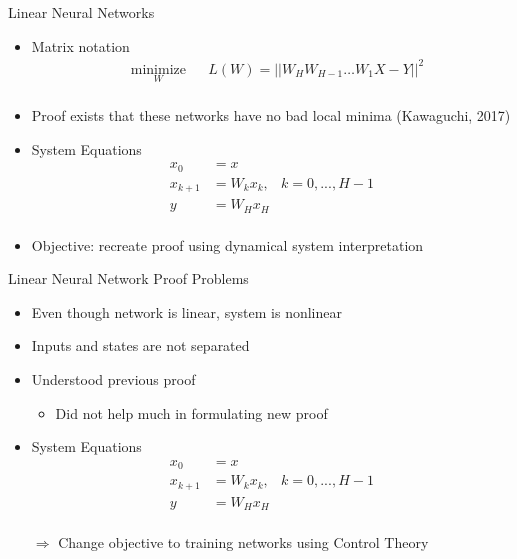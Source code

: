 \documentclass[11pt,t]{beamer}
\begin{document}
\begin{frame}{Linear Neural Networks}
   \begin{itemize}
      \item Matrix notation
      \begin{equation*}
      \begin{aligned}
      & \underset{W}{\text{minimize}}
      & & L(W) = ||W_HW_{H-1}\ldots W_1X - Y||^2 \\
      \end{aligned}
      \end{equation*}
      
      \item Proof exists that these networks have no bad local minima (Kawaguchi, 2017)\cite{DBLP:journals/corr/LuK17}
      
      \item System Equations
      \begin{equation*}
      \begin{aligned}
      x_0 &= x \\
      x_{k+1} &= W_kx_k, & k = 0,...,H-1 \\
      y &= W_Hx_H \\
      \end{aligned}
      \end{equation*}
      
      \item Objective: recreate proof using dynamical system interpretation
      
   \end{itemize}
\end{frame}

\begin{frame}{Linear Neural Network Proof Problems}

   \begin{itemize}
      
      \item Even though network is linear, system is nonlinear
      \item Inputs and states are not separated
      \item Understood previous proof
      \begin{itemize}
         \item Did not help much in formulating new proof
      \end{itemize}
      
      \item System Equations
      \begin{equation*}
      \begin{aligned}
      x_0 &= x \\
      x_{k+1} &= W_kx_k, & k = 0,...,H-1 \\
      y &= W_Hx_H \\
      \end{aligned}
      \end{equation*}
      
      $\Rightarrow$ Change objective to training networks using Control Theory
   \end{itemize}

\end{frame}
\end{document}
